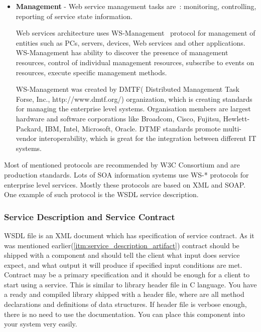 \begin{itemize}
Web services architecture uses WS-Security\footnote{WS-Security (Web Services
Security, short WSS) is an extension to SOAP to apply security to web services.
It is a member of the WS-* family of web service specifications and was
published by OASIS(Organization for the Advancement of Structured Information
Standards, \url{https://www.oasis-open.org/}). \cite{wikipedia:WS-Security}}
~protocol to solve security problems.
This protocol specifies how \gls{SOAP} messages may be secured.
 


\item \textbf{Management} -
Web service management tasks are~\cite{ws_arch}: monitoring, controlling,
reporting of service state information. 

Web services architecture uses WS-Management~\cite{ws_security_promo} protocol
for management of entities such as PCs, servers, devices, Web services and other
applications. WS-Management has ability to discover the presence of management resources,
control of individual management resources, subscribe to events on resources,
execute specific management methods.

WS-Management was created by DMTF( Distributed Management Task Forse, Inc.,
http://www.dmtf.org/) organization, which is creating standards for managing
the enterprise level systems. Organisation members are largest hardware and
software corporations like Broadcom, Cisco, Fujitsu, Hewlett-Packard, IBM, Intel,
Microsoft, Oracle. DTMF standards promote multi-vendor interoperability, which
is great for the integration between different IT systems. 

\end{itemize}

Most of mentioned protocols are recommended by W3C Consortium and are production
standards. Lots of \gls{SOA} information systems use WS-* protocols for
enterprise level services. Mostly these protocols are based on \gls{XML} and
\gls{SOAP}. One example of such protocol is the \gls{WSDL} service description.

\subsubsection{Service Description and Service Contract}
\label{sec:ws_service_contract}
\gls{WSDL} file is an \gls{XML} document which has specification of  service contract.
As it was mentioned earlier(\autoref{itm:service_description_artifact}) contract should be shipped with a component and should  tell the
client what input does service expect, and what output it will produce if specified input conditions are met. 
Contract may be a primary specification and it should be enough for a client to start using a service.
This is similar to library header file in C language. 
You have a ready and compiled library shipped with a header file, where are all
method declarations and definitions of data structures.
If header file is verbose enough, there is no need to use the documentation. You can place this component into your system very easily.



